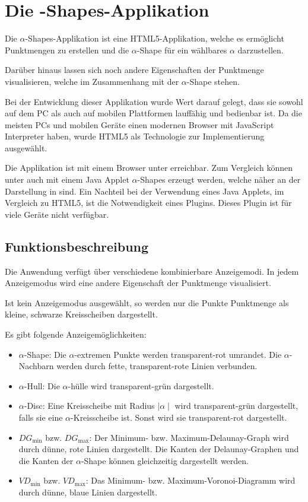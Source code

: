 
\chapter{Die \boldmath{$\alpha$}-Shapes-Applikation}

Die $\alpha$-Shapes-Applikation ist eine HTML5-Applikation, welche es ermöglicht \- Punktmengen zu erstellen und die $\alpha$-Shape für ein wählbares $\alpha$ darzustellen.

Darüber hinaus lassen sich noch andere Eigenschaften der Punktmenge visualisieren, welche im Zusammenhang mit der $\alpha$-Shape stehen.

Bei der Entwicklung dieser Applikation wurde Wert darauf gelegt, dass sie sowohl auf dem PC als auch auf mobilen Plattformen lauffähig und bedienbar ist. Da die meisten PCs und mobilen Geräte einen modernen Browser mit JavaScript Interpreter haben, wurde HTML5 als Technologie zur Implementierung ausgewählt.

Die Applikation ist mit einem Browser unter \autocite{alphaShapeHTML5} erreichbar. Zum Vergleich können unter \autocite{alpha_applet} auch mit einem Java Applet $\alpha$-Shapes erzeugt werden, welche näher an der Darstellung in \autocite{alpha1983} sind. Ein Nachteil bei der Verwendung eines Java Applets, im Vergleich zu HTML5, ist die Notwendigkeit eines Plugins. Dieses Plugin ist für viele Geräte nicht verfügbar.

\section{Funktionsbeschreibung}

Die Anwendung verfügt über verschiedene kombinierbare Anzeigemodi. In jedem Anzeigemodus wird eine andere Eigenschaft der Punktmenge visualisiert.

Ist kein Anzeigemodus ausgewählt, so werden nur die Punkte Punktmenge als kleine, schwarze Kreisscheiben dargestellt.

Es gibt folgende Anzeigemöglichkeiten:
\begin{itemize}
\item $\alpha$-Shape: Die $\alpha$-extremen Punkte werden transparent-rot umrandet. Die $\alpha$-Nachbarn werden durch fette, transparent-rote Linien verbunden.
\item $\alpha$-Hull: Die $\alpha$-hülle wird transparent-grün dargestellt.
\item $\alpha$-Disc: Eine Kreisscheibe mit Radius $\mid \alpha \mid$ wird transparent-grün dargestellt, falls sie eine $\alpha$-Kreisscheibe ist. Sonst wird sie transparent-rot dargestellt.
\item $DG_{\min}$ bzw. $DG_{\max}$: Der Minimum- bzw. Maximum-Delaunay-Graph wird durch dünne, rote Linien dargestellt. Die Kanten der Delaunay-Graphen und die Kanten der $\alpha$-Shape können gleichzeitig dargestellt werden.
\item $VD_{\min}$ bzw. $VD_{\max}$: Das Minimum- bzw. Maximum-Voronoi-Diagramm wird durch dünne, blaue Linien dargestellt.
\end{itemize}

